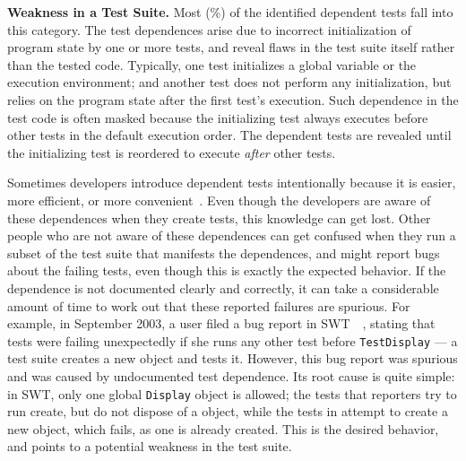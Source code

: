 \noindent \textbf{Weakness in a Test Suite.} Most (\%) of
the identified dependent tests fall into this category.
The test dependences arise due to incorrect initialization
of program state by one
or more tests, and reveal flaws in the test suite itself
rather than the tested code. Typically, one test initializes
a global variable or the execution environment; and another
test does not perform any initialization, but
relies on the program state after the first test's execution.
Such dependence in the test code is often masked because
the initializing test always executes before other tests in the
default execution order. The dependent tests are revealed
until the initializing test is reordered to execute
\textit{after} other tests. 


Sometimes developers introduce dependent tests intentionally because it is
easier, more efficient, or more convenient~\cite{kapfhammeretal:FSE:2003, whittakeretal:2012}.
Even though the developers are aware of these dependences
when they create tests, this knowledge can get lost.
Other people who are not aware of these dependences can get confused 
when they run a subset of the test suite that manifests the
dependences, and might report bugs about the failing tests,
even though this is exactly the expected behavior. 
If the dependence is not documented clearly and
correctly, it can take a considerable amount of time to work out that
these reported failures are spurious.
For example,
in September 2003, a user filed a
bug report in SWT~\cite{swt}~\cite{eclipsebug},
stating that  tests were failing unexpectedly
if she runs any other test before \texttt{TestDisplay} --- 
a test suite creates a new  object and tests it.
However, this bug report was spurious and was
caused by undocumented test dependence.
Its root cause is quite simple: in SWT, only one global \texttt{Display}
object is allowed; the tests that reporters try to run
create, but do not dispose of a  object, while
the tests in  attempt to create
a new  object, which fails, as one
is already created. This is the desired behavior,
and points to a potential weakness in the test suite.

